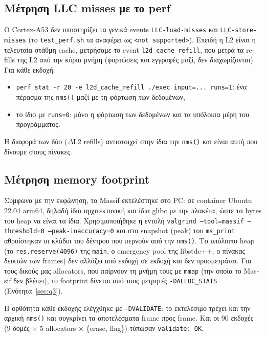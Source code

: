 \documentclass[11pt,a4paper]{article}
\newcommand{\en}[1]{\textlatin{#1}}
\begin{document}
\subsection{Μέτρηση \en{LLC misses} με το \en{perf}}
Ο \en{Cortex-A53} δεν υποστηρίζει τα γενικά \en{events} \en{\texttt{LLC-load-misses}} και \en{\texttt{LLC-store-misses}} (το \en{\texttt{test\_perf.sh}} τα αναφέρει ως \en{\texttt{<not supported>}}). Επειδή η \en{L2} είναι η τελευταία στάθμη \en{cache}, μετρήσαμε το \en{event} \en{\texttt{l2d\_cache\_refill}}, που μετρά τα \en{refills} της \en{L2} από την κύρια μνήμη (φορτώσεις και εγγραφές μαζί, δεν διαχωρίζονται). Για κάθε εκδοχή:
\begin{itemize}
    \item \en{\texttt{perf stat -r 20 -e l2d\_cache\_refill ./exec input=... runs=1}}: ένα πέρασμα της \en{\texttt{nms()}} μαζί με τη φόρτωση των δεδομένων,
    \item το ίδιο με \en{\texttt{runs=0}}: μόνο η φόρτωση των δεδομένων και τα υπόλοιπα μέρη του προγράμματος.
\end{itemize}
Η διαφορά των δύο (\en{$\Delta$L2 refills}) αντιστοιχεί στην ίδια την \en{\texttt{nms()}} και είναι αυτή που δίνουμε στους πίνακες.

\subsection{Μέτρηση \en{memory footprint}}
Σύμφωνα με την εκφώνηση, το \en{Massif} εκτελέστηκε στο \en{PC}: σε \en{container Ubuntu 22.04 arm64}, δηλαδή ίδια αρχιτεκτονική και ίδια \en{glibc} με την πλακέτα, ώστε τα \en{bytes} του \en{heap} να είναι τα ίδια. Χρησιμοποιήθηκε η εντολή
\en{\texttt{valgrind --tool=massif --threshold=0 --peak-inaccuracy=0}}
και στο \en{snapshot (peak)} του \en{\texttt{ms\_print}} αθροίστηκαν οι κλάδοι του δέντρου που περνούν από την \en{\texttt{nms()}}. Το υπόλοιπο \en{heap} (το \en{\texttt{res.reserve(4096)}} της \en{\texttt{main}}, ο \en{emergency pool} της \en{libstdc++}, ο πίνακας δεικτών των \en{frames}) δεν αλλάζει από εκδοχή σε εκδοχή και δεν προσμετράται. Για τους δικούς μας \en{allocators}, που παίρνουν τη μνήμη τους με \en{\texttt{mmap}} (την οποία το \en{Massif} δεν βλέπει), το \en{footprint} δίνεται από τους μετρητές \en{\texttt{-DALLOC\_STATS}} (Ενότητα~\ref{sec:q3}).

Η ορθότητα κάθε εκδοχής ελέγχθηκε με \en{\texttt{-DVALIDATE}}: το εκτελέσιμο τρέχει και την αρχική \en{\texttt{nms()}} και συγκρίνει τα αποτελέσματα \en{frame} προς \en{frame}. Και οι 90 εκδοχές (9 δομές $\times$ 5 \en{allocators} $\times$ \{\en{erase}, \en{flag}\}) τύπωσαν \en{\texttt{validate: OK}}.
\end{document}
